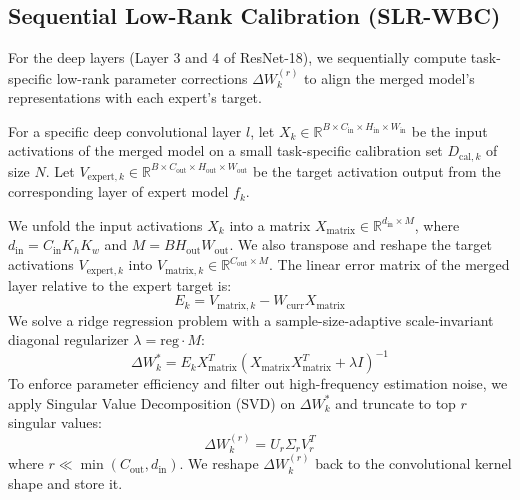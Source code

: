 \documentclass{article}
\theoremstyle{plain}
\theoremstyle{definition}
\theoremstyle{remark}
\begin{document}
\subsection{Sequential Low-Rank Calibration (SLR-WBC)}
For the deep layers (Layer 3 and 4 of ResNet-18), we sequentially compute task-specific low-rank parameter corrections $\Delta W_k^{(r)}$ to align the merged model's representations with each expert's target.

For a specific deep convolutional layer $l$, let $X_k \in \mathbb{R}^{B \times C_{\text{in}} \times H_{\text{in}} \times W_{\text{in}}}$ be the input activations of the merged model on a small task-specific calibration set $D_{\text{cal}, k}$ of size $N$. Let $V_{\text{expert}, k} \in \mathbb{R}^{B \times C_{\text{out}} \times H_{\text{out}} \times W_{\text{out}}}$ be the target activation output from the corresponding layer of expert model $f_k$.

We unfold the input activations $X_k$ into a matrix $X_{\text{matrix}} \in \mathbb{R}^{d_{\text{in}} \times M}$, where $d_{\text{in}} = C_{\text{in}} K_h K_w$ and $M = B H_{\text{out}} W_{\text{out}}$. We also transpose and reshape the target activations $V_{\text{expert}, k}$ into $V_{\text{matrix}, k} \in \mathbb{R}^{C_{\text{out}} \times M}$. 
The linear error matrix of the merged layer relative to the expert target is:
\begin{equation}
    E_k = V_{\text{matrix}, k} - W_{\text{curr}} X_{\text{matrix}}
\end{equation}
We solve a ridge regression problem with a sample-size-adaptive scale-invariant diagonal regularizer $\lambda = \text{reg} \cdot M$:
\begin{equation}
    \Delta W_k^* = E_k X_{\text{matrix}}^T (X_{\text{matrix}} X_{\text{matrix}}^T + \lambda I)^{-1}
\end{equation}
To enforce parameter efficiency and filter out high-frequency estimation noise, we apply Singular Value Decomposition (SVD) on $\Delta W_k^*$ and truncate to top $r$ singular values:
\begin{equation}
    \Delta W_k^{(r)} = U_r \Sigma_r V_r^T
\end{equation}
where $r \ll \min(C_{\text{out}}, d_{\text{in}})$. We reshape $\Delta W_k^{(r)}$ back to the convolutional kernel shape and store it.
\end{document}
